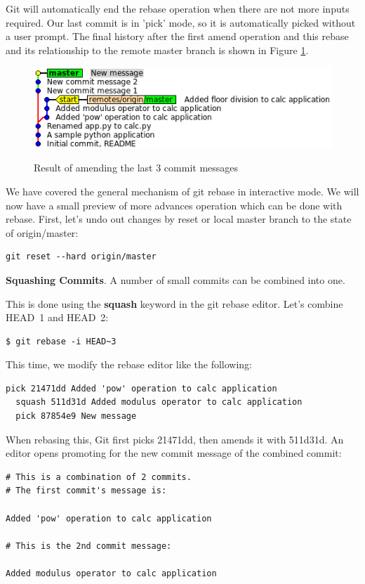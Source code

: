 \documentclass{../common/tufte-latex/tufte-handout}
\begin{document}
Git will automatically end the rebase operation when there are not more inputs required.
Our last commit is in 'pick' mode, so it is automatically picked without a user prompt.
The final history after the first amend operation and this rebase and its relationship to the remote master branch is shown in Figure \ref{fig:gitrebase-amend}.

\begin{figure}%
  \centering
  \includegraphics[width=0.75\linewidth]{gitrebase-amend.png}
  \label{fig:gitrebase-amend}
  \caption{Result of amending the last 3 commit messages}
\end{figure}

\noindent We have covered the general mechanism of git rebase in interactive mode. 
We will now have a small preview of more advances operation which can be done with rebase.
First, let's undo out changes by reset or local master branch to the state of origin/master:

\begin{lstlisting}[style=BashInputStyle]
  git reset --hard origin/master
\end{lstlisting}

\noindent \textbf{Squashing Commits}.
A number of small commits can be combined into one.

This is done using the \textbf{squash} keyword in the git rebase editor.
Let's combine HEAD~1 and HEAD~2:

\begin{lstlisting}[style=BashInputStyle]
  $ git rebase -i HEAD~3
\end{lstlisting}

This time, we modify the rebase editor like the following:
\begin{lstlisting}[style=BashInputStyle]
  pick 21471dd Added 'pow' operation to calc application
  squash 511d31d Added modulus operator to calc application
  pick 87854e9 New message
\end{lstlisting}

When rebasing this, Git first picks 21471dd, then amends it with 511d31d.
An editor opens promoting for the new commit message of the combined commit:
\begin{lstlisting}[style=BashInputStyle]
# This is a combination of 2 commits.
# The first commit's message is:

Added 'pow' operation to calc application

# This is the 2nd commit message:

Added modulus operator to calc application
\end{lstlisting}
\end{document}
